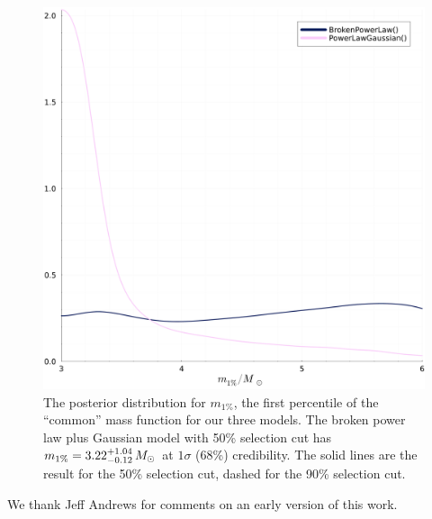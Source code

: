 \documentclass[modern]{aastex631}
\begin{document}
\begin{figure}
    \includegraphics[width=\columnwidth]{figures/m1pct.pdf}
    \caption{\label{fig:m1pct} The posterior distribution for $m_{1\%}$, the
    first percentile of the ``common'' mass function for our three models.  The
    broken power law plus Gaussian model with 50\% selection cut has $m_{1\%} =
    3.22^{+1.04}_{-0.12} \, M_\odot$ at $1\sigma$ (68\%) credibility.  The solid lines are
    the result for the 50\% selection cut, dashed for the 90\% selection cut.}
\end{figure}



\begin{acknowledgments}
    We thank Jeff Andrews for comments on an early version of this work.
\end{acknowledgments}


\clearpage


\end{document}
